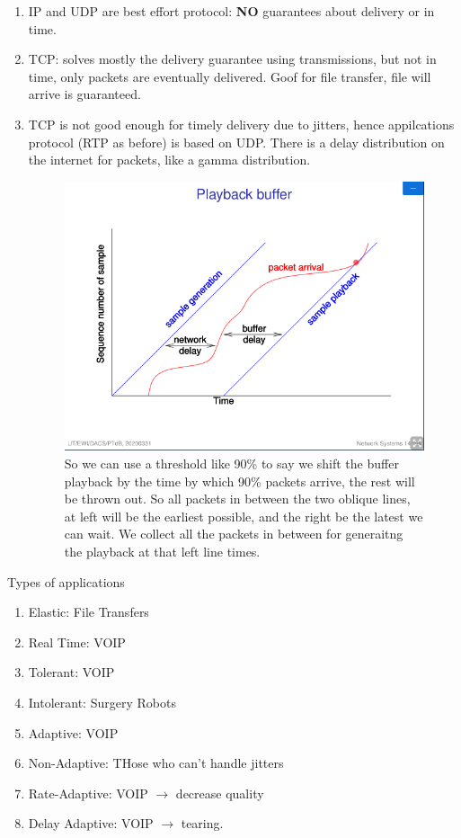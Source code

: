 \documentclass[12pt]{book}
\begin{document}
\begin{enumerate}
    \item IP and UDP are best effort protocol: \textbf{NO} guarantees about delivery or in time.
    \item TCP: solves mostly the delivery guarantee using transmissions, but not in time, only packets are eventually delivered. Goof for file transfer, file will arrive is guaranteed.
    \item TCP is not good enough for timely delivery due to jitters, hence appilcations protocol (RTP as before) is based on UDP. There is a delay distribution on the internet for packets, like a gamma distribution.
    \begin{figure}[H]
        \centering
        \includegraphics{Pictures/RTP QOS.png}
        \caption{So we can use a threshold like 90\% to say we shift the buffer playback by the time by which 90\% packets arrive, the rest will be thrown out. So all packets in between the two oblique lines, at left will be the earliest possible, and the right be the latest we can wait. We collect all the packets in between for generaitng the playback at that left line times.}
        \label{fig:my_label}
    \end{figure}
\end{enumerate}

Types of applications
\begin{enumerate}
    \item Elastic: File Transfers
    \item Real Time: VOIP
    \item Tolerant: VOIP
    \item Intolerant: Surgery Robots
    \item Adaptive: VOIP
    \item Non-Adaptive: THose who can't handle jitters
    \item Rate-Adaptive: VOIP $\to$ decrease quality
    \item Delay Adaptive: VOIP $\to$ tearing.
\end{enumerate}
\end{document}
